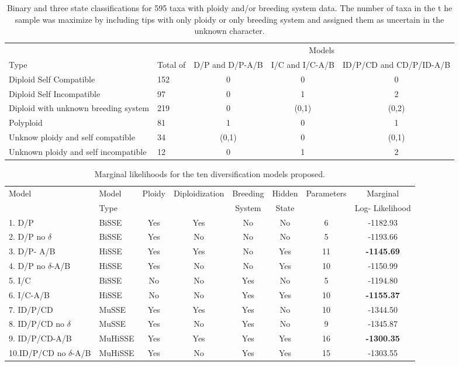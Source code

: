 \begin{table}
\begin{tabular}{@{}llccc@{}} \toprule
\multicolumn{4}{r}{Models} \\ \cmidrule(r){3-5}
Type & Total of & D/P and D/P-A/B& I/C and I/C-A/B & ID/P/CD and CD/P/ID-A/B\\ \midrule
Diploid Self Compatible & 152 & 0 &  0 & 0 \\
Diploid Self Incompatible& 97 & 0  & 1 & 2\\
Diploid with unknown breeding system & 219 & 0 & (0,1) & (0,2) \\
Polyploid & 81 & 1& 0 & 1 \\
Unknow ploidy and self compatible& 34 & (0,1)& 0 & (0,1) \\ 
Unknown ploidy and self incompatible & 12 & 0 & 1 & 2 \\ \bottomrule
\end{tabular}
\caption{Binary and three state classifications for 595 taxa with ploidy and/or breeding system data. The number of taxa in the t he sample was maximize by including tips with only ploidy or only breeding system and assigned them as uncertain in the unknown character.}
\label{table:stateclassifications}
\end{table}


\begin{table}
\begin{tabular}{@{}llcccccc@{}} \toprule
Model& Model& Ploidy & Diploidization & Breeding  & Hidden & Parameters & Marginal \\
& Type & &  &System & State & & Log- Likelihood \\
1. D/P &BiSSE &	Yes  &	Yes &	No	&No	& 6	& -1182.93 \\
2. D/P no $\delta$ & BiSSE  &	Yes & 	No	& No	& No & 	5 &	-1193.66\\
3. D/P- A/B  & HiSSE &	Yes &	Yes	&No &	Yes &	11 &	\textbf{-1145.69}\\
4. D/P no $\delta$-A/B &	HiSSE &	Yes & No &	No &	Yes &	10	&-1150.99\\
5. I/C &	BiSSE &	No &	 No	&Yes &	No &	 5 &  -1194.80 \\
6. I/C-A/B &	HiSSE &	No &	 No	&Yes &	Yes	& 10 & \textbf{-1155.37}\\
7. ID/P/CD & MuSSE &	Yes & 	Yes &	Yes &	No &	10 & -1344.50\\
8. ID/P/CD no $\delta$ &	MuSSE &	Yes & 	No &	Yes	&No &	9 &-1345.87\\
9. ID/P/CD-A/B & MuHiSSE &	Yes 	&Yes &	Yes &	Yes &	16 & \textbf{-1300.35} \\
10.ID/P/CD no $\delta$-A/B &	 MuHiSSE	 & Yes & 	No	&Yes &	Yes	&15 &-1303.55 \\ \bottomrule
\end{tabular}
\caption{Marginal likelihoods for the ten diversification models proposed.}
\label{table:marginallike}
\end{table}


